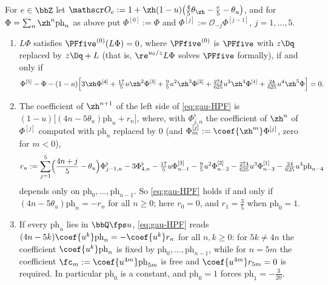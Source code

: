 \begin{lem}[HPF]
\label{lem:gau-HPF}
For $e\in\bbZ$ let $\mathscr O_e:=1+\zh(1-u)\bigl(\tfrac45\theta_{\zh}-\tfrac e5-\theta_u\bigr)$, and for $\Phi=\sum_n\zh^n\mathrm{ph}_n$ as above put $\Phi^{[0]}:=\Phi$ and $\Phi^{[j]}:=\mathscr O_{-j}\Phi^{[j-1]}$, $j=1,\dots,5$.
\begin{enumerate}
\item $L\Phi$ satisfies $\PFfive^{(0)}(L\Phi)=0$, where $\PFfive^{(0)}$ is $\PFfive$ with $z\Dq$ replaced by $z\Dq+L$ (that is, $\re^{u_0/z}L\Phi$ solves $\PFfive$ formally), if and only if
\begin{equation}
\label{eq:gau-HPF}
\Phi^{[5]}-\Phi-(1-u)\Bigl[3\zh\Phi^{[4]}+\tfrac{17}5u\zh^2\Phi^{[3]}+\tfrac95u^2\zh^3\Phi^{[2]}+\tfrac{274}{625}u^3\zh^4\Phi^{[1]}+\tfrac{24}{625}u^4\zh^5\Phi\Bigr]=0 .
\end{equation}
\item The coefficient of $\zh^{n+1}$ of the left side of \eqref{eq:gau-HPF} is $(1-u)\bigl[(4n-5\theta_u)\mathrm{ph}_n+r_n\bigr]$, where, with $\Phi^\flat_{j,n}$ the coefficient of $\zh^n$ of $\Phi^{[j]}$ computed with $\mathrm{ph}_n$ replaced by $0$ (and $\Phi^{[j]}_m:=\coef{\zh^m}\Phi^{[j]}$, zero for $m<0$),
\[
r_n:=\sum_{j=1}^5\Bigl(\frac{4n+j}5-\theta_u\Bigr)\Phi^\flat_{j-1,n}-3\Phi^\flat_{4,n}-\tfrac{17}5u\Phi^{[3]}_{n-1}-\tfrac95u^2\Phi^{[2]}_{n-2}-\tfrac{274}{625}u^3\Phi^{[1]}_{n-3}-\tfrac{24}{625}u^4\mathrm{ph}_{n-4}
\]
depends only on $\mathrm{ph}_0,\dots,\mathrm{ph}_{n-1}$. So \eqref{eq:gau-HPF} holds if and only if $(4n-5\theta_u)\mathrm{ph}_n=-r_n$ for all $n\geq0$; here $r_0=0$, and $r_1=\frac35$ when $\mathrm{ph}_0=1$.
\item If every $\mathrm{ph}_n$ lies in $\bbQ\fps u$, \eqref{eq:gau-HPF} reads $(4n-5k)\coef{u^k}\mathrm{ph}_n=-\coef{u^k}r_n$ for all $n,k\geq0$: for $5k\neq4n$ the coefficient $\coef{u^k}\mathrm{ph}_n$ is fixed by $\mathrm{ph}_0,\dots,\mathrm{ph}_{n-1}$, while for $n=5m$ the coefficient $\fc_m:=\coef{u^{4m}}\mathrm{ph}_{5m}$ is free and $\coef{u^{4m}}r_{5m}=0$ is required. In particular $\mathrm{ph}_0$ is a constant, and $\mathrm{ph}_0=1$ forces $\mathrm{ph}_1=-\frac3{20}$.
\end{enumerate}
\end{lem}

